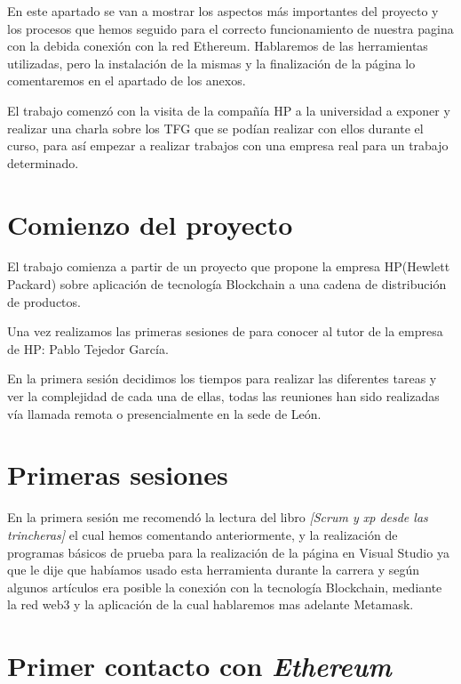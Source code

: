 
En este apartado se van a mostrar los aspectos más importantes del
proyecto y los procesos que hemos seguido para el correcto funcionamiento de nuestra pagina con la debida conexión con la red Ethereum. Hablaremos de las herramientas utilizadas, pero la instalación de la mismas y la finalización de la página lo comentaremos en el apartado de los anexos.

El trabajo comenzó con la visita de la compañía HP a la universidad a exponer y realizar una charla sobre los TFG que se podían realizar con ellos durante el curso, para así empezar a realizar trabajos con una empresa real para un trabajo determinado.

\section{Comienzo del proyecto}

El trabajo comienza a partir de un proyecto que propone la empresa HP(Hewlett Packard) sobre aplicación de tecnología Blockchain a una cadena de distribución de productos. 

Una vez realizamos las primeras sesiones de para conocer al tutor de la empresa de HP: Pablo Tejedor García.

En la primera sesión decidimos los tiempos para realizar las diferentes tareas y ver la complejidad de cada una de ellas, todas las reuniones han sido realizadas vía llamada remota o presencialmente en la sede de León.

\section{Primeras sesiones}

En la primera sesión me recomendó la lectura del libro \textit{[Scrum y xp desde las trincheras]} el cual hemos comentando anteriormente, y la realización de programas básicos de prueba para la realización de la página en Visual Studio ya que le dije que habíamos usado esta herramienta durante la carrera y según algunos artículos era posible la conexión con la tecnología Blockchain, mediante la red web3 y la aplicación de la cual hablaremos mas adelante Metamask.


\section{Primer contacto con \textit{Ethereum}}

